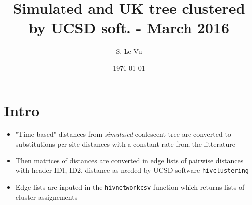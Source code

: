 \documentclass[]{revtex4}\usepackage[]{graphicx}\usepackage[]{color}
\begin{document}
\title{Simulated and UK tree clustered by UCSD soft. - March 2016}
\author{S. Le Vu}
\date{\today}

\maketitle





\section{Intro}
\begin{itemize}
\item "Time-based" distances from \emph{simulated} coalescent tree are converted to substitutions per site distances with a constant rate from the litterature
\item Then matrices of distances are converted in edge lists of pairwise distances with header ID1, ID2, distance as needed by UCSD software \texttt{hivclustering}
\item Edge lists are inputed in the \texttt{hivnetworkcsv} function which returns lists of cluster assignements
\end{itemize}
\end{document}
